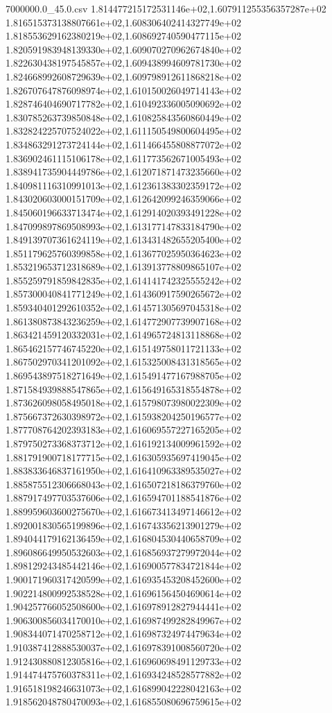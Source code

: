 \begin{filecontents*}{7000000.0_45.0.csv}
1.814477215172531146e+02,1.607911255356357287e+02
1.816515373138807661e+02,1.608306402414327749e+02
1.818553629162380219e+02,1.608692740590477115e+02
1.820591983948139330e+02,1.609070270962674840e+02
1.822630438197545857e+02,1.609438994609781730e+02
1.824668992608729639e+02,1.609798912611868218e+02
1.826707647876098974e+02,1.610150026049714143e+02
1.828746404690717782e+02,1.610492336005090692e+02
1.830785263739850848e+02,1.610825843560860449e+02
1.832824225707524022e+02,1.611150549800604495e+02
1.834863291273724144e+02,1.611466455808877072e+02
1.836902461115106178e+02,1.611773562671005493e+02
1.838941735904449786e+02,1.612071871473235660e+02
1.840981116310991013e+02,1.612361383302359172e+02
1.843020603000151709e+02,1.612642099246359066e+02
1.845060196633713474e+02,1.612914020393491228e+02
1.847099897869508993e+02,1.613177147833184790e+02
1.849139707361624119e+02,1.613431482655205400e+02
1.851179625760399858e+02,1.613677025950364623e+02
1.853219653712318689e+02,1.613913778809865107e+02
1.855259791859842835e+02,1.614141742325555242e+02
1.857300040841771249e+02,1.614360917590265672e+02
1.859340401292610352e+02,1.614571305697045318e+02
1.861380873843236259e+02,1.614772907739907168e+02
1.863421459120332031e+02,1.614965724813118868e+02
1.865462157746745220e+02,1.615149758011721133e+02
1.867502970341201092e+02,1.615325008431318565e+02
1.869543897518271649e+02,1.615491477167988705e+02
1.871584939888547865e+02,1.615649165318554878e+02
1.873626098058495018e+02,1.615798073980022309e+02
1.875667372630398972e+02,1.615938204250196577e+02
1.877708764202393183e+02,1.616069557227165205e+02
1.879750273368373712e+02,1.616192134009961592e+02
1.881791900718177715e+02,1.616305935697419045e+02
1.883833646837161950e+02,1.616410963389535027e+02
1.885875512306668043e+02,1.616507218186379760e+02
1.887917497703537606e+02,1.616594701188541876e+02
1.889959603600275670e+02,1.616673413497146612e+02
1.892001830565199896e+02,1.616743356213901279e+02
1.894044179162136459e+02,1.616804530440658709e+02
1.896086649950532603e+02,1.616856937279972044e+02
1.898129243485442146e+02,1.616900577834721844e+02
1.900171960317420599e+02,1.616935453208452600e+02
1.902214800992538528e+02,1.616961564504690614e+02
1.904257766052508600e+02,1.616978912827944441e+02
1.906300856034170010e+02,1.616987499282849967e+02
1.908344071470258712e+02,1.616987324974479634e+02
1.910387412888530037e+02,1.616978391008560720e+02
1.912430880812305816e+02,1.616960698491129733e+02
1.914474475760378311e+02,1.616934248528577882e+02
1.916518198246631073e+02,1.616899042228042163e+02
1.918562048780470093e+02,1.616855080696759615e+02

\end{filecontents*}
